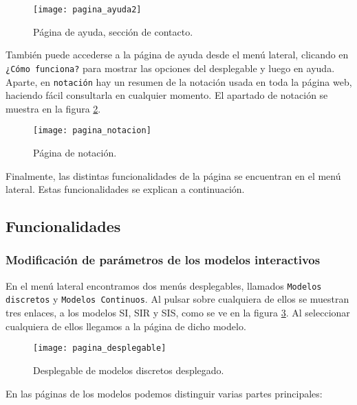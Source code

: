 \begin{figure}
\begin{center}
\caption{Página de ayuda, sección de contacto.}
\label{manual: ayuda2}
\texttt{[image: pagina\_ayuda2]}
\end{center}
\end{figure}

También puede accederse a la página de ayuda desde el menú lateral, clicando en \verb|¿Cómo funciona?| para mostrar las opciones del desplegable y luego en ayuda. Aparte, en \verb|notación| hay un resumen de la notación usada en toda la página web, haciendo fácil consultarla en cualquier momento. El apartado de notación se muestra en la figura \ref{manual: notacion}.

\begin{figure}
\begin{center}
\caption{Página de notación.}
\label{manual: notacion}
\texttt{[image: pagina\_notacion]}
\end{center}
\end{figure}

Finalmente, las distintas funcionalidades de la página se encuentran en el menú lateral. Estas funcionalidades se explican a continuación.

\subsection{Funcionalidades}

\subsubsection{Modificación de parámetros de los modelos interactivos}

En el menú lateral encontramos dos menús desplegables, llamados \verb|Modelos| \verb|discretos| y \verb|Modelos Continuos|. Al pulsar sobre cualquiera de ellos se muestran tres enlaces, a los modelos SI, SIR y SIS, como se ve en la figura \ref{manual: desplegable}. Al seleccionar cualquiera de ellos llegamos a la página de dicho modelo.

\begin{figure}
\begin{center}
\caption{Desplegable de modelos discretos desplegado.}
\label{manual: desplegable}
\texttt{[image: pagina\_desplegable]}
\end{center}
\end{figure}

En las páginas de los modelos podemos distinguir varias partes principales:

